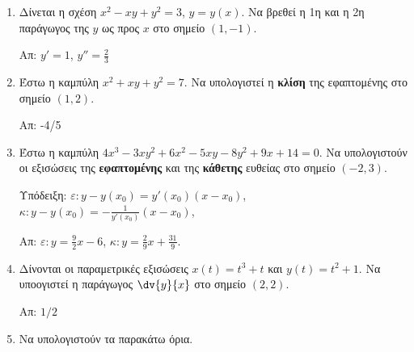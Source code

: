 \begin{enumerate}
  \item Δίνεται η σχέση $ x^{2} - xy + y^{2} = 3 $, $ y=y(x) $. Να βρεθεί η 1η
    και η 2η παράγωγος της $y$ ως προς $x$ στο σημείο $ (1,-1) $.

    \hfill Απ: $ y' = 1$, $ y'' = \frac{2}{3} $

  \item Έστω η καμπύλη $ x^{2} + xy + y^{2} = 7 $. Να υπολογιστεί η \textbf{κλίση} της 
    εφαπτομένης στο σημείο $ (1,2) $.

    \hfill Απ: -4/5 

  \item Έστω η καμπύλη $ 4x^{3} - 3xy^{2} + 6x^{2} - 5xy - 8 y^{2} + 9x + 14
    = 0$. Να υπολογιστούν οι εξισώσεις της \textbf{εφαπτομένης} και της \textbf{κάθετης} 
    ευθείας στο σημείο  $ (-2,3) $.

    \textcolor{Col1}{Υπόδειξη:} 
    $ \varepsilon: y-y(x_{0}) = y'(x_{0})(x- x_{0}) $, \;
    $ \kappa: y-y(x_{0}) = -\frac{1}{y'(x_{0})}(x- x_{0}) $, \;

    \hfill Απ: $\varepsilon\colon y = \frac{9}{2} x - 6 $, 
    $\kappa\colon y = \frac{2}{9} x + \frac{31}{9} $.

  \item Δίνονται οι παραμετρικές εξισώσεις $ x(t)=t^{3}+t $ και $ y(t)=t^{2}+1 $. 
    Να υποογιστεί η παράγωγος $ \dv{y}{x} $ στο σημείο $ (2,2) $.

    \hfill Απ: $ 1/2 $

  \item Να υπολογιστούν τα παρακάτω όρια.
    \begin{enumerate}[i)]
    \end{enumerate}
\end{enumerate}




